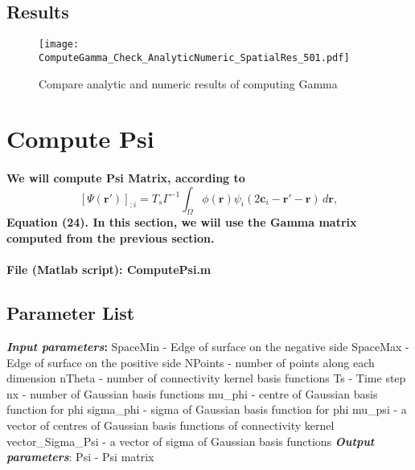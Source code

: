 \documentclass[a4paper, 12pt, english]{article}
\begin{document}
\subsection{Results}
\begin{figure}[H]
\centering
\texttt{[image: ComputeGamma\_Check\_AnalyticNumeric\_SpatialRes\_501.pdf]}
\caption{Compare analytic and numeric results of computing Gamma}
\end{figure}

\newpage



\section{Compute Psi}
\paragraph{We will compute Psi Matrix, according to
$$[\Psi(\boldsymbol{r}\prime)]_{:i}= T_s\Gamma^{-1}\int_{\Omega}\phi(\boldsymbol{r})\psi_i(2\boldsymbol{c}_i-\boldsymbol{r}\prime- \boldsymbol{r})\,d\boldsymbol{r},$$
Equation (24). In this section, we
wiil use the Gamma matrix computed from the previous section.}
\paragraph{File (Matlab script): ComputePsi.m}


\subsection{Parameter List}
\textbf{\textit{Input parameters}:}\newline
SpaceMin - Edge of surface on the negative side \newline
SpaceMax - Edge of surface on the positive side \newline
NPoints - number of points along each dimension \newline
nTheta - number of connectivity kernel basis functions \newline
Ts - Time step \newline
nx - number of Gaussian basis functions \newline
mu\_phi - centre of Gaussian basis function for phi \newline
sigma\_phi - sigma of Gaussian basis function for phi \newline
mu\_psi - a vector of centres of Gaussian basis functions of connectivity kernel \newline
vector\_Sigma\_Psi - a vector of sigma of Gaussian basis functions \newline
\textbf{\textit{Output parameters}}:\newline
Psi - Psi matrix
\end{document}
